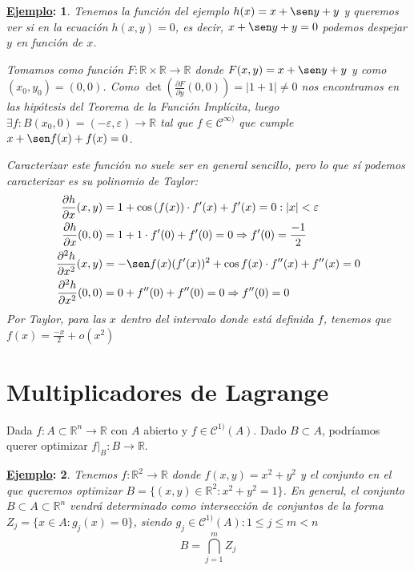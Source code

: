 \documentclass[10pt,a4paper,openright]{book}
\theoremstyle{break}
\newtheorem*{ej}{\underline{Ejemplo}:}
\begin{document}
\begin{ej}
Tenemos la función del ejemplo $h(x) = x + \sen y + y$ y queremos ver si en la ecuación $h(x,y)=0$, es decir, $x + \sen y + y = 0$ podemos despejar $y$ en función de $x$.

Tomamos como función $F: \mathbb{R} \times  \mathbb{R} \to \mathbb{R}$ donde $F(x,y) = x + \sen y + y$ y como $(x_0, y_0) = (0,0)$. Como $\det(\frac{\partial F}{\partial y} (0,0)) = |1+ 1| \neq 0$ nos encontramos en las hipótesis del Teorema de la Función Implícita, luego $\exists f : B(x_0, 0)=(-\varepsilon, \varepsilon) \to \mathbb{R}$ tal que $f \in \mathcal{C}^{\infty )}$ que cumple $x + \sen f(x) + f(x) = 0$.

Caracterizar este función no suele ser en general sencillo, pero lo que sí podemos caracterizar es su polinomio de Taylor:
\begin{align*}
\frac{\partial h}{\partial x}(x,y) &= 1 + \cos \left(f(x)\right) \cdot f'(x) + f'(x) = 0 : |x| < \varepsilon \\
\frac{\partial h}{\partial x} (0,0) &= 1 + 1 \cdot f'(0) + f'(0) = 0 \Rightarrow f'(0) = \frac{-1}{2} \\
\frac{\partial^2 h}{\partial x^2}(x,y) &= - \sen f(x) (f'(x))^2 + \cos f(x) \cdot f''(x) + f''(x) = 0 \\
\frac{\partial^2 h}{\partial x^2} (0,0) &= 0 + f''(0) + f''(0) = 0 \Rightarrow f''(0) = 0
\end{align*}
Por Taylor, para las $x$ dentro del intervalo donde está definida $f$, tenemos que $f(x) = \frac{-x}{2} + o(x^2)$
\end{ej}

\newpage

\section{Multiplicadores de Lagrange}
Dada $f: A \subset \mathbb{R}^n \to \mathbb{R}$ con $A$ abierto y $f \in \mathcal{C}^{1)}(A)$. Dado $B \subset A$, podríamos querer optimizar $f|_B : B \to \mathbb{R}$.

\begin{ej}
Tenemos $f : \mathbb{R}^2 \to \mathbb{R}$ donde $f(x,y) = x^2 + y^2$ y el conjunto en el que queremos optimizar $B = \{(x,y) \in \mathbb{R}^2 : x^2 + y^2 = 1\}$. En general, el conjunto $B \subset A  \subset \mathbb{R}^n$ vendrá determinado como intersección de conjuntos de la forma $Z_j = \{x \in A : g_j (x) = 0\}$, siendo $g_j \in \mathcal{C}^{1)} (A) : 1 \leq j \leq m < n$
$$B = \bigcap_{j = 1}^m Z_j$$
\end{ej}
\end{document}
